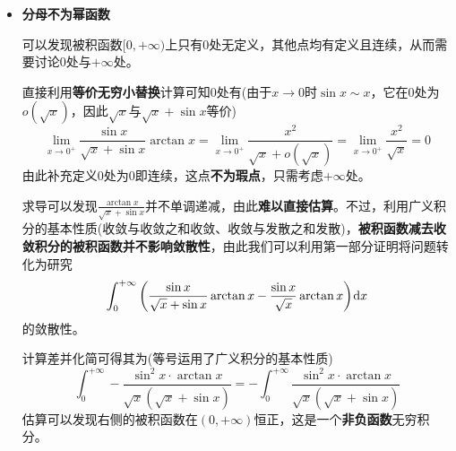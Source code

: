 \documentclass[a4paper,UTF8,fontset=windows,AutoFakeBold]{ctexart}
\newcommand*{\dr}{\hspace{0.07em}\mathrm{d}}
\theoremstyle{ex}
\begin{document}
\begin{framed}
{\begin{itemize}
        \item \textbf{分母不为幂函数} 
        
        可以发现被积函数$[0,+\infty)$上只有0处无定义，其他点均有定义且连续，从而需要讨论0处与$+\infty$处。

        直接利用\textbf{等价无穷小替换}计算可知0处有(由于$x\to0$时$\sin x\sim x$，它在0处为$o(\sqrt{x})$，因此$\sqrt{x}$与$\sqrt{x}+\sin x$等价)
        $$\lim_{x\to0^+}\frac{\sin x}{\sqrt{x}+\sin x}\arctan x=\lim_{x\to0^+}\frac{x^2}{\sqrt{x}+o(\sqrt{x})}=\lim_{x\to0^+}\frac{x^2}{\sqrt{x}}=0$$
        由此补充定义0处为0即连续，这点\textbf{不为瑕点}，只需考虑$+\infty$处。

        求导可以发现$\frac{\arctan x}{\sqrt{x}+\sin x}$并不单调递减，由此\textbf{难以直接估算}。不过，利用广义积分的基本性质(收敛与收敛之和收敛、收敛与发散之和发散)，\textbf{被积函数减去收敛积分的被积函数并不影响敛散性}，由此我们可以利用第一部分证明将问题转化为研究
        $$\int_0^{+\infty}\bigg(\frac{\sin x}{\sqrt{x}+\sin x}\arctan x-\frac{\sin x}{\sqrt{x}}\arctan x\bigg)\dr x$$
        的敛散性。

        计算差并化简可得其为(等号运用了广义积分的基本性质)
        $$\int_0^{+\infty}-\frac{\sin^2x\cdot\arctan x}{\sqrt{x}(\sqrt{x}+\sin x)}=-\int_0^{+\infty}\frac{\sin^2x\cdot\arctan x}{\sqrt{x}(\sqrt{x}+\sin x)}$$
        估算可以发现右侧的被积函数在$(0,+\infty)$恒正，这是一个\textbf{非负函数}无穷积分。


\end{itemize}}
\end{framed}
\end{document}
